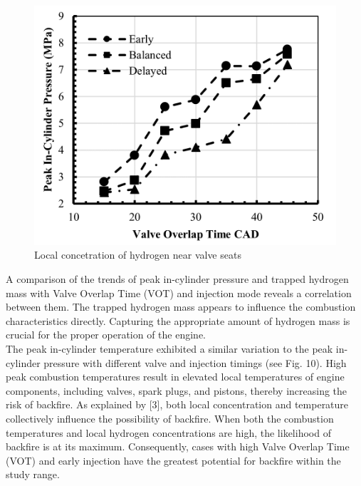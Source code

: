 \documentclass[conference]{IEEEtran}
\begin{document}
\begin{figure}[htbp]
    \centerline{\includegraphics{plots and graphs/9.png}}
    \caption{Local concetration of hydrogen near valve seats}
    \label{plt_9}
    \end{figure}

A comparison of the trends of peak in-cylinder pressure and trapped hydrogen mass with Valve Overlap Time (VOT) and injection mode reveals a correlation between them. The trapped hydrogen mass appears to influence the combustion characteristics directly. Capturing the appropriate amount of hydrogen mass is crucial for the proper operation of the engine.\\

The peak in-cylinder temperature exhibited a similar variation to the peak in-cylinder pressure with different valve and injection timings (see Fig. 10). High peak combustion temperatures result in elevated local temperatures of engine components, including valves, spark plugs, and pistons, thereby increasing the risk of backfire. As explained by [3], both local concentration and temperature collectively influence the possibility of backfire. When both the combustion temperatures and local hydrogen concentrations are high, the likelihood of backfire is at its maximum. Consequently, cases with high Valve Overlap Time (VOT) and early injection have the greatest potential for backfire within the study range.
\end{document}
